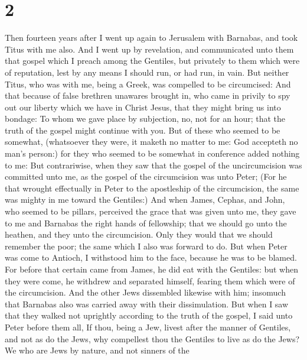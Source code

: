 \hypertarget{section-1}{%
\section{2}\label{section-1}}

 Then fourteen years after I went up again to Jerusalem
with Barnabas, and took Titus with me also.  And I went up
by revelation, and communicated unto them that gospel which I preach
among the Gentiles, but privately to them which were of reputation, lest
by any means I should run, or had run, in vain.  But
neither Titus, who was with me, being a Greek, was compelled to be
circumcised:  And that because of false brethren unawares
brought in, who came in privily to spy out our liberty which we have in
Christ Jesus, that they might bring us into bondage:  To
whom we gave place by subjection, no, not for an hour; that the truth of
the gospel might continue with you.  But of these who
seemed to be somewhat, (whatsoever they were, it maketh no matter to me:
God accepteth no man's person:) for they who seemed to be somewhat in
conference added nothing to me:  But contrariwise, when
they saw that the gospel of the uncircumcision was committed unto me, as
the gospel of the circumcision was unto Peter;  (For he
that wrought effectually in Peter to the apostleship of the
circumcision, the same was mighty in me toward the Gentiles:)
 And when James, Cephas, and John, who seemed to be
pillars, perceived the grace that was given unto me, they gave to me and
Barnabas the right hands of fellowship; that we should go unto the
heathen, and they unto the circumcision.  Only they would
that we should remember the poor; the same which I also was forward to
do.  But when Peter was come to Antioch, I withstood him
to the face, because he was to be blamed.  For before
that certain came from James, he did eat with the Gentiles: but when
they were come, he withdrew and separated himself, fearing them which
were of the circumcision.  And the other Jews dissembled
likewise with him; insomuch that Barnabas also was carried away with
their dissimulation.  But when I saw that they walked not
uprightly according to the truth of the gospel, I said unto Peter before
them all, If thou, being a Jew, livest after the manner of Gentiles, and
not as do the Jews, why compellest thou the Gentiles to live as do the
Jews?  We who are Jews by nature, and not sinners of the
